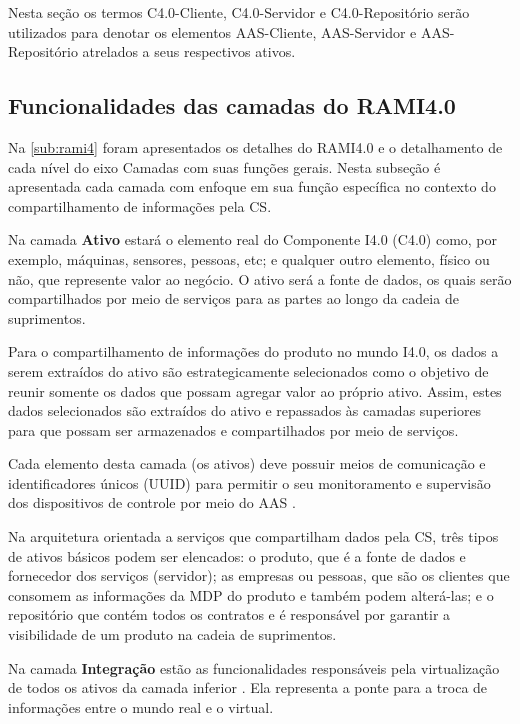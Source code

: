 	Nesta seção os termos C4.0-Cliente, C4.0-Servidor e C4.0-Repositório serão utilizados para denotar os elementos AAS-Cliente, AAS-Servidor e AAS-Repositório atrelados a seus respectivos ativos.

\subsection{Funcionalidades das camadas do RAMI4.0}

	Na \autoref{sub:rami4} foram apresentados os detalhes do RAMI4.0 e o detalhamento de cada nível do eixo Camadas com suas funções gerais. Nesta subseção é apresentada cada camada com enfoque em sua função específica no contexto do compartilhamento de informações pela CS.

	Na camada \textbf{Ativo} estará o elemento real do Componente I4.0 (C4.0) como, por exemplo, máquinas, sensores, pessoas, etc; e qualquer outro elemento, físico ou não, que represente valor ao negócio. O ativo será a fonte de dados, os quais serão compartilhados por meio de serviços para as partes ao longo da cadeia de suprimentos.
	
	Para o compartilhamento de informações do produto no mundo I4.0, os dados a serem extraídos do ativo são estrategicamente selecionados como o objetivo de reunir somente os dados que possam agregar valor ao próprio ativo. Assim, estes dados selecionados são extraídos do ativo e repassados às camadas superiores para que possam ser armazenados e compartilhados por meio de serviços.
	
	Cada elemento desta camada (os ativos) deve possuir meios de comunicação e identificadores únicos (UUID) para permitir o seu monitoramento e supervisão dos dispositivos de controle por meio do AAS \cite{adolphs2015rami}.
	
	Na arquitetura orientada a serviços que compartilham dados pela CS, três tipos de ativos básicos podem ser elencados: o produto, que é a fonte de dados e fornecedor dos serviços (servidor); as empresas ou pessoas, que são os clientes que consomem as informações da MDP do produto e também podem alterá-las; e o repositório que contém todos os contratos e é responsável por garantir a visibilidade de um produto na cadeia de suprimentos.
	
	Na camada \textbf{Integração} estão as funcionalidades responsáveis pela virtualização de todos os ativos da camada inferior \cite{adolphs2015rami}. Ela representa a ponte para a troca de informações entre o mundo real e o virtual.
	
